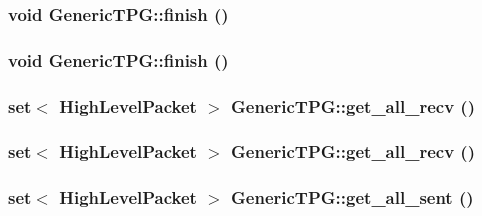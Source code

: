 \hypertarget{classGenericTPG_8dd8fa2cd2721789a63084d8fe912366}{
\subsubsection[{finish}]{\setlength{\rightskip}{0pt plus 5cm}void GenericTPG::finish ()}}
\label{classGenericTPG_8dd8fa2cd2721789a63084d8fe912366}


\hypertarget{classGenericTPG_8dd8fa2cd2721789a63084d8fe912366}{
\subsubsection[{finish}]{\setlength{\rightskip}{0pt plus 5cm}void GenericTPG::finish ()}}
\label{classGenericTPG_8dd8fa2cd2721789a63084d8fe912366}


\hypertarget{classGenericTPG_aca7529b0e19d664ee40392b7761e338}{
\subsubsection[{get\_\-all\_\-recv}]{\setlength{\rightskip}{0pt plus 5cm}set$<$ {\bf HighLevelPacket} $>$ GenericTPG::get\_\-all\_\-recv ()}}
\label{classGenericTPG_aca7529b0e19d664ee40392b7761e338}


\hypertarget{classGenericTPG_aca7529b0e19d664ee40392b7761e338}{
\subsubsection[{get\_\-all\_\-recv}]{\setlength{\rightskip}{0pt plus 5cm}set$<$ {\bf HighLevelPacket} $>$ GenericTPG::get\_\-all\_\-recv ()}}
\label{classGenericTPG_aca7529b0e19d664ee40392b7761e338}


\hypertarget{classGenericTPG_2b424dd4b2f5aa07a0231d69d5790470}{
\subsubsection[{get\_\-all\_\-sent}]{\setlength{\rightskip}{0pt plus 5cm}set$<$ {\bf HighLevelPacket} $>$ GenericTPG::get\_\-all\_\-sent ()}}
\label{classGenericTPG_2b424dd4b2f5aa07a0231d69d5790470}


